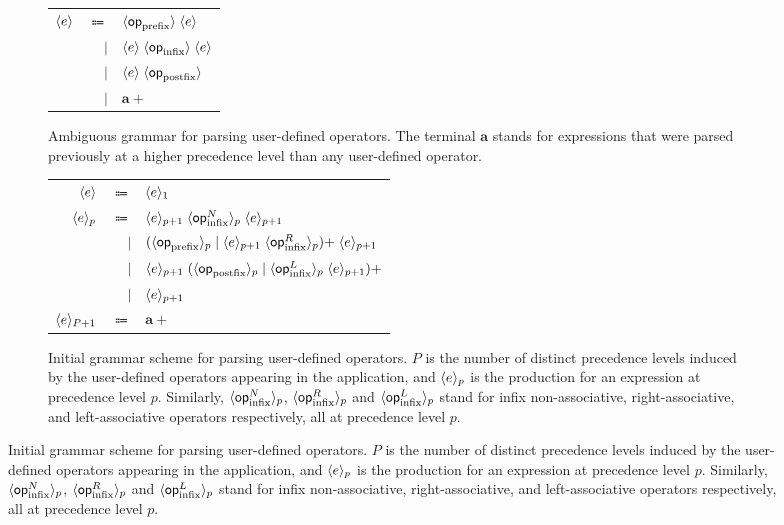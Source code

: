 {\newcommand{\prefix}{\mathsf{op}_{\text{prefix}}}
\newcommand{\infix}{\mathsf{op}_{\text{infix}}}
\newcommand{\infixl}{\mathsf{op}_{\text{infix}}^L}
\newcommand{\infixr}{\mathsf{op}_{\text{infix}}^R}
\newcommand{\infixn}{\mathsf{op}_{\text{infix}}^N}
\newcommand{\postfix}{\mathsf{op}_{\text{postfix}}}
\begin{figure}[!htb]
\begin{subfigure}{\linewidth}
\centering
\begin{tabular}{rrl}
$ \langle e\rangle $ & $ \Coloneqq $ & $ \angled{\prefix} \; \angled{e} $\\
& $ \mid $ & $ \angled{e} \; \angled{\infix} \; \angled{e} $\\
& $ \mid $ & $ \angled{e} \; \angled{\postfix} $\\
& $ \mid $ & $ \mathbf{a}+ $
\end{tabular}
\caption{Ambiguous grammar for parsing user-defined operators. The terminal $ \mathbf{a} $ stands for expressions that were parsed previously at a higher precedence level than any user-defined operator.}
\label{figure:user-defined-operators-initial-grammar}
\end{subfigure}
\par\bigskip
\begin{subfigure}{\linewidth}
\centering
\begin{tabular}{rrl}
$ \langle e\rangle $ & $ \Coloneqq $ & $ \langle e\rangle_1 $\\
$ \langle e\rangle_p $ & $ \Coloneqq $ & $ \angled{e}_{p + 1} \; \angled{\infixn}_p \; \angled{e}_{p + 1} $\\
& $ \mid $ & $ (\angled{\prefix}_p \mid \angled{e}_{p + 1} \; \angled{\infixr}_p){+} \; \angled{e}_{p + 1} $\\
& $ \mid $ & $ \angled{e}_{p + 1} \; (\angled{\postfix}_p \mid \angled{\infixl}_p \; \angled{e}_{p + 1}){+} $\\
& $ \mid $ & $ \langle e\rangle_{p + 1} $\\
$ \langle e\rangle_{P + 1} $ & $ \Coloneqq $ & $ \mathbf{a}+ $
\end{tabular}
\caption{%
Initial grammar scheme for parsing user-defined operators.
$ P $ is the number of distinct precedence levels induced by the user-defined operators appearing in the application, and $ \langle e\rangle_p $ is the production for an expression at precedence level $ p $.
Similarly, $ \angled{\infixn}_p $, $ \angled{\infixr}_p $ and $ \angled{\infixl}_p $ stand for infix non-associative, right-associative, and left-associative operators respectively, all at precedence level $ p $.
}
\end{subfigure}
\end{figure}}

